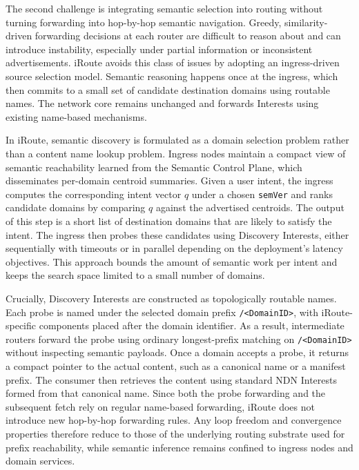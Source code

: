 \documentclass[conference]{IEEEtran}
\newcommand{\sysname}{iRoute}
\begin{document}
The second challenge is integrating semantic selection into routing without turning forwarding into hop-by-hop semantic navigation. Greedy, similarity-driven forwarding decisions at each router are difficult to reason about and can introduce instability, especially under partial information or inconsistent advertisements. \sysname{} avoids this class of issues by adopting an ingress-driven source selection model. Semantic reasoning happens once at the ingress, which then commits to a small set of candidate destination domains using routable names.
The network core remains unchanged and forwards Interests using existing name-based mechanisms.

In \sysname{}, semantic discovery is formulated as a domain selection problem rather than a content name lookup problem. Ingress nodes maintain a compact view of semantic reachability learned from the Semantic Control Plane, which disseminates per-domain centroid summaries. Given a user intent, the ingress computes the corresponding intent vector $q$ under a chosen \texttt{semVer} and ranks candidate domains by comparing $q$ against the advertised centroids. The output of this step is a short list of destination domains that are likely to satisfy the intent. The ingress then probes these candidates using Discovery Interests, either sequentially with timeouts or in parallel depending on the deployment's latency objectives. This approach bounds the amount of semantic work per intent and keeps the search space limited to a small number of domains.

Crucially, Discovery Interests are constructed as topologically routable names.
Each probe is named under the selected domain prefix \texttt{/<DomainID>}, with \sysname{}-specific components placed after the domain identifier. As a result, intermediate routers forward the probe using ordinary longest-prefix matching on \texttt{/<DomainID>} without inspecting semantic payloads. Once a domain accepts a probe, it returns a compact pointer to the actual content, such as a canonical name or a manifest prefix. The consumer then retrieves the content using standard NDN Interests formed from that canonical name. Since both the probe forwarding and the subsequent fetch rely on regular name-based forwarding, \sysname{} does not introduce new hop-by-hop forwarding rules. Any loop freedom and convergence properties therefore reduce to those of the underlying routing substrate used for prefix reachability, while semantic inference remains confined to ingress nodes and domain services.
\end{document}
